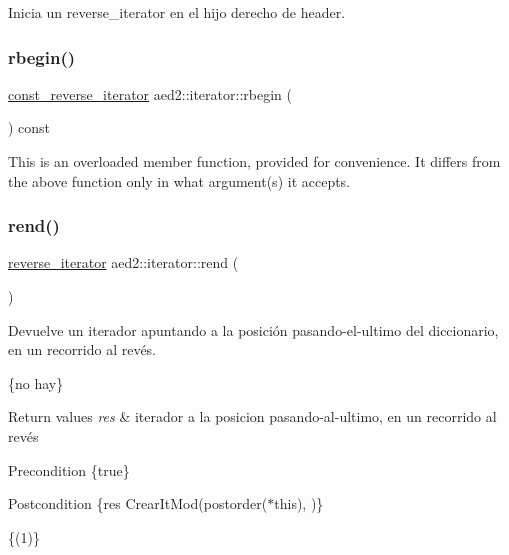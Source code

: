 Inicia un reverse\+\_\+iterator en el hijo derecho de header. \mbox{\label{classaed2_1_1iterator_a633182fba99ef1a9f10f7bb836f990e0}} 
\subsubsection{\texorpdfstring{rbegin()}{rbegin()}\hspace{0.1cm}{\footnotesize\ttfamily [2/2]}}
{\footnotesize\ttfamily \hyperlink{classaed2_1_1iterator_a657402896e5b5966660032f5686cc4c4}{const\+\_\+reverse\+\_\+iterator} aed2\+::iterator\+::rbegin (\begin{DoxyParamCaption}{ }\end{DoxyParamCaption}) const\hspace{0.3cm}{\ttfamily [inline]}}

This is an overloaded member function, provided for convenience. It differs from the above function only in what argument(s) it accepts. \mbox{\label{classaed2_1_1iterator_a0007a7962bc6aca8dca78c2a49bd581d}} 
\subsubsection{\texorpdfstring{rend()}{rend()}\hspace{0.1cm}{\footnotesize\ttfamily [1/2]}}
{\footnotesize\ttfamily \hyperlink{classaed2_1_1iterator_a07b2c0fa31611e03cd019b290acd6d80}{reverse\+\_\+iterator} aed2\+::iterator\+::rend (\begin{DoxyParamCaption}{ }\end{DoxyParamCaption})\hspace{0.3cm}{\ttfamily [inline]}}



Devuelve un iterador apuntando a la posición pasando-\/el-\/ultimo del diccionario, en un recorrido al revés. 

\{no hay\}


\begin{DoxyRetVals}{Return values}
{\em res} & iterador a la posicion pasando-\/al-\/ultimo, en un recorrido al revés\\
\hline
\end{DoxyRetVals}
\begin{DoxyPrecond}{Precondition}
\{true\} 
\end{DoxyPrecond}
\begin{DoxyPostcond}{Postcondition}
\{res  Crear\+It\+Mod(postorder($\ast$this),  )\}
\end{DoxyPostcond}
\{(1)\}


